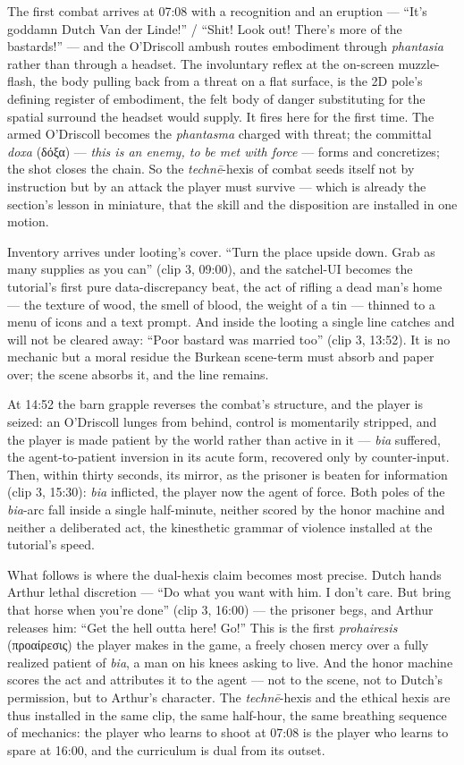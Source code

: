 \documentclass{article}
\newcommand{\gk}[1]{{\greekfont #1}}
\begin{document}
The first combat arrives at 07:08 with a recognition and an eruption — ``It's goddamn Dutch Van der Linde!'' / ``Shit! Look out! There's more of the bastards!'' — and the O'Driscoll ambush routes embodiment through \textit{phantasia} rather than through a headset. The involuntary reflex at the on-screen muzzle-flash, the body pulling back from a threat on a flat surface, is the 2D pole's defining register of embodiment, the felt body of danger substituting for the spatial surround the headset would supply. It fires here for the first time. The armed O'Driscoll becomes the \textit{phantasma} charged with threat; the committal \textit{doxa} (\gk{δόξα}) — \textit{this is an enemy, to be met with force} — forms and concretizes; the shot closes the chain. So the \textit{technē}-hexis of combat seeds itself not by instruction but by an attack the player must survive — which is already the section's lesson in miniature, that the skill and the disposition are installed in one motion.

Inventory arrives under looting's cover. ``Turn the place upside down. Grab as many supplies as you can'' (clip 3, 09:00), and the satchel-UI becomes the tutorial's first pure data-discrepancy beat, the act of rifling a dead man's home — the texture of wood, the smell of blood, the weight of a tin — thinned to a menu of icons and a text prompt. And inside the looting a single line catches and will not be cleared away: ``Poor bastard was married too'' (clip 3, 13:52). It is no mechanic but a moral residue the Burkean scene-term must absorb and paper over; the scene absorbs it, and the line remains.

At 14:52 the barn grapple reverses the combat's structure, and the player is seized: an O'Driscoll lunges from behind, control is momentarily stripped, and the player is made patient by the world rather than active in it — \textit{bia} suffered, the agent-to-patient inversion in its acute form, recovered only by counter-input. Then, within thirty seconds, its mirror, as the prisoner is beaten for information (clip 3, 15:30): \textit{bia} inflicted, the player now the agent of force. Both poles of the \textit{bia}-arc fall inside a single half-minute, neither scored by the honor machine and neither a deliberated act, the kinesthetic grammar of violence installed at the tutorial's speed.

What follows is where the dual-hexis claim becomes most precise. Dutch hands Arthur lethal discretion — ``Do what you want with him. I don't care. But bring that horse when you're done'' (clip 3, 16:00) — the prisoner begs, and Arthur releases him: ``Get the hell outta here! Go!'' This is the first \textit{prohairesis} (\gk{προαίρεσις}) the player makes in the game, a freely chosen mercy over a fully realized patient of \textit{bia}, a man on his knees asking to live. And the honor machine scores the act and attributes it to the agent — not to the scene, not to Dutch's permission, but to Arthur's character. The \textit{technē}-hexis and the ethical hexis are thus installed in the same clip, the same half-hour, the same breathing sequence of mechanics: the player who learns to shoot at 07:08 is the player who learns to spare at 16:00, and the curriculum is dual from its outset.
\end{document}
